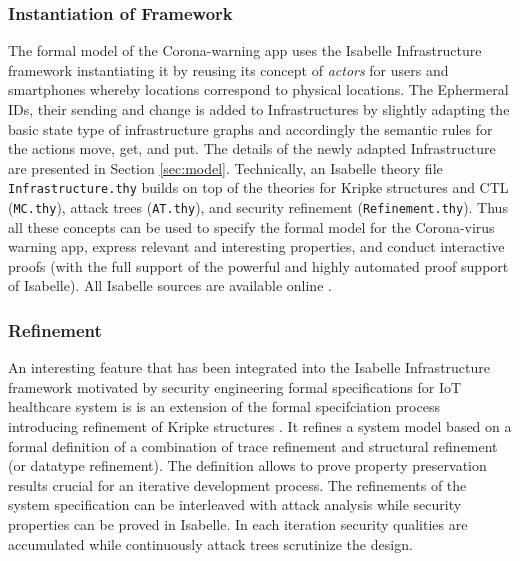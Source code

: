 \documentclass{llncs}
\begin{document}
\subsubsection{Instantiation of Framework}
The formal model of the Corona-warning app uses the Isabelle Infrastructure framework instantiating it
by reusing its concept of {\it actors} for users and smartphones whereby locations correspond
to physical locations. The Ephermeral IDs, their sending and change is added to Infrastructures
by slightly adapting the basic state type of infrastructure graphs and accordingly the semantic rules
for the actions move, get, and put. The details of the newly adapted Infrastructure are
presented in Section \ref{sec:model}.
Technically, an Isabelle theory file \texttt{Infrastructure.thy} builds on top of the theories for Kripke 
structures and CTL (\texttt{MC.thy}), attack trees (\texttt{AT.thy}), and security refinement 
(\texttt{Refinement.thy}). Thus all these concepts can be used to specify the formal model
for the Corona-virus warning app, express relevant and interesting properties, and conduct
interactive proofs (with the full support of the powerful and highly automated proof support
of Isabelle).
All Isabelle sources are available online \cite{kam:20gitsc}.

\subsubsection{Refinement}
An interesting feature that has been integrated into the Isabelle Infrastructure
framework motivated by security engineering formal specifications for IoT healthcare
system is  is an extension of the formal specifciation process introducing
refinement of Kripke structures \cite{kam:19a,kam:20a}. It refines a system model based on a 
formal definition of a combination of trace refinement and structural 
refinement (or datatype refinement). The definition allows to prove property preservation results 
crucial for an iterative development process.
The refinements of the system specification  can be interleaved with attack 
analysis while security properties can be proved in Isabelle. In each iteration
security qualities are accumulated while continuously attack trees scrutinize
the design.
\end{document}
